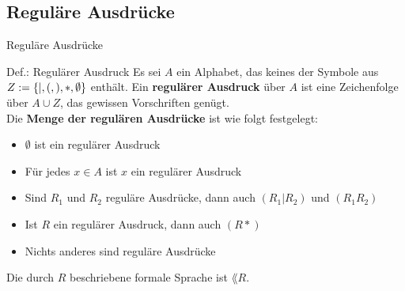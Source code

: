 \subsection{Reguläre Ausdrücke}

\begin{frame}{Reguläre Ausdrücke}
\begin{block}{Def.: Regulärer Ausdruck}
	Es sei $A$ ein Alphabet, das keines der Symbole aus $Z := \left\{ \mid, (, ), *, \emptyset \right\}$ enthält.
	Ein \textbf{regulärer Ausdruck} über $A$ ist eine Zeichenfolge über $A \cup Z$, das gewissen Vorschriften genügt.\\
	Die \textbf{Menge der regulären Ausdrücke} ist wie folgt festgelegt:
	\begin{itemize}
		\item $\emptyset$ ist ein regulärer Ausdruck
		\item Für jedes $x \in A$ ist $x$ ein regulärer Ausdruck
		\item Sind $R_1$ und $R_2$ reguläre Ausdrücke, dann auch $(R_1 | R_2 )$ und $(R_1R_2)$
		\item Ist $R$ ein regulärer Ausdruck, dann auch $(R*)$
		\item Nichts anderes sind reguläre Ausdrücke
	\end{itemize}
	Die durch $R$ beschriebene formale Sprache ist $\lang{R}$.
\end{block}
\end{frame}


